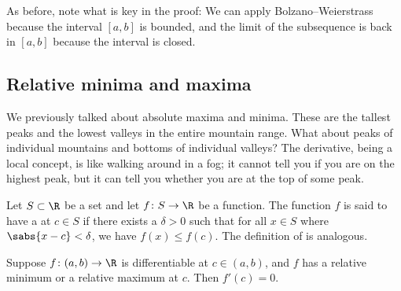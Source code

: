 As before, note what is key in the proof: We can apply Bolzano--Weierstrass
because the interval $[a,b]$ is bounded, and the limit of the subsequence is
back in $[a,b]$ because the interval is closed.



\subsection{Relative minima and maxima}

We previously talked about absolute maxima and minima.  These are the tallest peaks and
the lowest valleys in the entire mountain range.  What
about peaks of individual mountains and bottoms of individual valleys?
The derivative, being a local concept, is like walking around in a fog; it
cannot tell you if you are on the highest peak, but it can tell you whether you are
at the top of some peak.

\begin{defn}
Let $S \subset \R$ be a set and
let $f \colon S \to \R$ be a function.  The function $f$ is said to have
a \emph{}
at $c \in S$ if there exists a $\delta>0$
such that for all $x \in S$ where $\sabs{x-c} < \delta$,
we have $f(x) \leq f(c)$.
The definition of
\emph{}
is analogous.
\end{defn}

\begin{lemma}\label{relminmax:lemma}
Suppose $f \colon (a,b) \to \R$ is differentiable at $c \in (a,b)$,
and $f$ has
a relative minimum or a relative maximum at $c$.  Then
$f'(c) = 0$.
\end{lemma}

